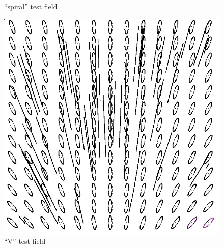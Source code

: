 \documentclass{scrartcl}
\begin{document}
\begin{figure}[!t]
\begin{minipage}{0.3\textwidth}
    \caption{``spiral'' test field}
    \label{b)}
  \end{minipage}
  \begin{minipage}{0.3\textwidth}
    \includegraphics[height=\textwidth]{img/drain_old.png}
    \caption{``V'' test field    }
    \label{b)}
  \end{minipage}
\label{test-fields}
\end{figure}
\end{document}
